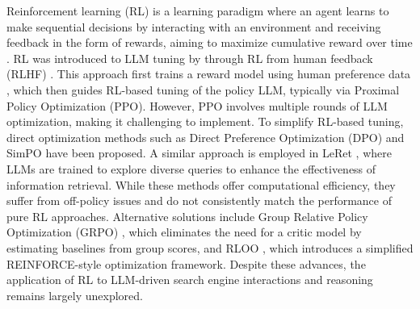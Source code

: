 Reinforcement learning (RL) \citep{kaelbling1996reinforcement} is a learning paradigm where an agent learns to make sequential decisions by interacting with an environment and receiving feedback in the form of rewards, aiming to maximize cumulative reward over time \citep{sutton1999reinforcement}. RL was introduced to LLM tuning by \cite{ouyang2022training} through RL from human feedback (RLHF) \citep{kaufmann2023survey}. This approach first trains a reward model using human preference data \citep{lambert2024rewardbench}, which then guides RL-based tuning of the policy LLM, typically via Proximal Policy Optimization (PPO). However, PPO involves multiple rounds of LLM optimization, making it challenging to implement.
To simplify RL-based tuning, direct optimization methods such as Direct Preference Optimization (DPO) \citep{rafailov2023direct} and SimPO \citep{meng2024simpo} have been proposed. 
A similar approach is employed in LeRet \citep{hsu2024grounding}, where LLMs are trained to explore diverse queries to enhance the effectiveness of information retrieval.
While these methods offer computational efficiency, they suffer from off-policy issues \citep{pang2024iterative} and do not consistently match the performance of pure RL approaches. Alternative solutions include Group Relative Policy Optimization (GRPO) \citep{shao2024deepseekmath}, which eliminates the need for a critic model by estimating baselines from group scores, and RLOO \citep{ahmadian2024back}, which introduces a simplified REINFORCE-style \citep{williams1992simple} optimization framework. 
Despite these advances, the application of RL to LLM-driven search engine interactions and reasoning remains largely unexplored.
